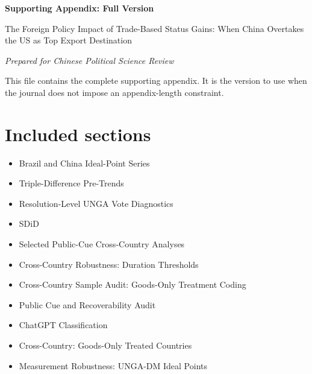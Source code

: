 \documentclass[11pt]{article}
\begin{document}
\thispagestyle{empty}

\begin{center}

{\Large\bfseries Supporting Appendix: Full Version\par}

\vspace{0.5cm}

{\large The Foreign Policy Impact of Trade-Based Status Gains: When China Overtakes the US as Top Export Destination\par}

\vspace{0.3cm}

\emph{Prepared for Chinese Political Science Review}

\end{center}

\vspace{0.8cm}

This file contains the complete supporting appendix. It is the version to use when the journal does not impose an appendix-length constraint.

\section*{Included sections}

\begin{itemize}

\item Brazil and China Ideal-Point Series

\item Triple-Difference Pre-Trends

\item Resolution-Level UNGA Vote Diagnostics

\item SDiD

\item Selected Public-Cue Cross-Country Analyses

\item Cross-Country Robustness: Duration Thresholds

\item Cross-Country Sample Audit: Goods-Only Treatment Coding

\item Public Cue and Recoverability Audit

\item ChatGPT Classification

\item Cross-Country: Goods-Only Treated Countries

\item Measurement Robustness: UNGA-DM Ideal Points

\end{itemize}
\end{document}
